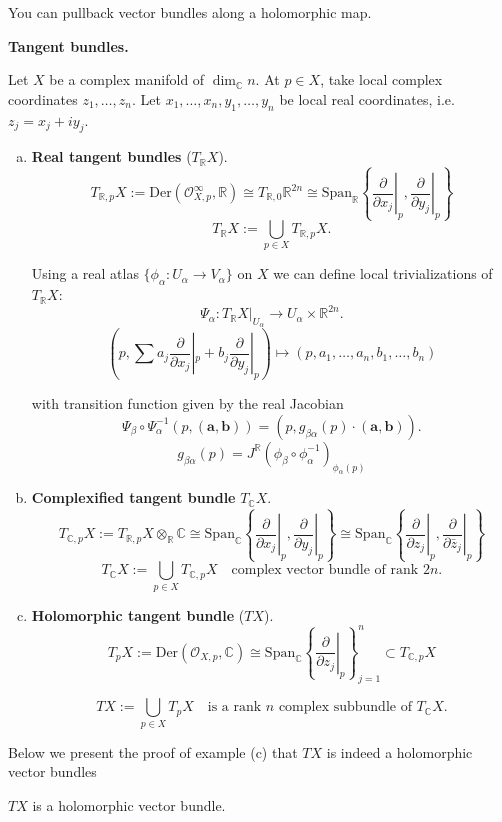 \documentclass{article}
\begin{document}
\begin{remark}
You can pullback vector bundles along a holomorphic map.
\end{remark}

\begin{example}
\textbf{Tangent bundles.}

Let $X$ be a complex manifold of $\dim_{\mathbb{C}} n$. At $p \in X$, take local complex coordinates $z_1, \dots, z_n$. Let $x_1, \dots, x_n, y_1, \dots, y_n$ be local real coordinates, i.e. $z_j = x_j + i y_j$.

\begin{enumerate}[(a)]
    \item \textbf{Real tangent bundles} ($T_{\mathbb{R}} X$).
    $$T_{\mathbb{R}, p} X := \mathrm{Der}(\mathcal{O}_{X, p}^{\infty}, \mathbb{R}) \cong T_{\mathbb{R}, 0} \mathbb{R}^{2n} \cong \mathrm{Span}_{\mathbb{R}} \left\{ \left. \frac{\partial}{\partial x_j} \right|_p, \left. \frac{\partial}{\partial y_j} \right|_p \right\}$$
    $$T_{\mathbb{R}} X := \bigcup_{p \in X} T_{\mathbb{R}, p} X.$$
    
    Using a real atlas $\{ \phi_\alpha: U_\alpha \to V_\alpha \}$ on $X$ we can define local trivializations of $T_{\mathbb{R}} X$:
    $$\Psi_\alpha: T_{\mathbb{R}} X|_{U_\alpha} \to U_\alpha \times \mathbb{R}^{2n}.$$
    $$(p, \sum a_j \frac{\partial}{\partial x_j}|_p + b_j \frac{\partial}{\partial y_j}|_p) \mapsto (p, a_1, \dots, a_n, b_1, \dots, b_n)$$
    
    with transition function given by the real Jacobian
    $$\Psi_\beta \circ \Psi_\alpha^{-1}(p, (\mathbf{a}, \mathbf{b})) = (p, g_{\beta \alpha}(p) \cdot (\mathbf{a}, \mathbf{b})).$$
    $$g_{\beta \alpha}(p) = J^{\mathbb{R}}(\phi_\beta \circ \phi_\alpha^{-1})_{\phi_\alpha(p)}$$

    \item \textbf{Complexified tangent bundle} $T_{\mathbb{C}} X$.
    $$T_{\mathbb{C}, p} X := T_{\mathbb{R}, p} X \otimes_{\mathbb{R}} \mathbb{C} \cong \mathrm{Span}_{\mathbb{C}} \left\{ \left. \frac{\partial}{\partial x_j} \right|_p, \left. \frac{\partial}{\partial y_j} \right|_p \right\} \cong \mathrm{Span}_{\mathbb{C}} \left\{ \left. \frac{\partial}{\partial z_j} \right|_p, \left. \frac{\partial}{\partial \bar{z}_j} \right|_p \right\}$$
    $$T_{\mathbb{C}} X := \bigcup_{p \in X} T_{\mathbb{C}, p} X \quad \text{complex vector bundle of rank } 2n.$$

\item \textbf{Holomorphic tangent bundle} ($TX$).
    $$T_p X := \mathrm{Der}(\mathcal{O}_{X,p}, \mathbb{C}) \cong \mathrm{Span}_{\mathbb{C}} \left\{ \left. \frac{\partial}{\partial z_j} \right|_p \right\}_{j=1}^n \subset T_{\mathbb{C}, p} X$$
    
    $$T X := \bigcup_{p \in X} T_p X \quad \text{is a rank } n \text{ complex subbundle of } T_{\mathbb{C}} X.$$
\end{enumerate}
\end{example}
Below we present the proof of example (c) that $TX$ is indeed a holomorphic vector bundles
\begin{claim}
$TX$ is a holomorphic vector bundle.
\end{claim}
\end{document}
